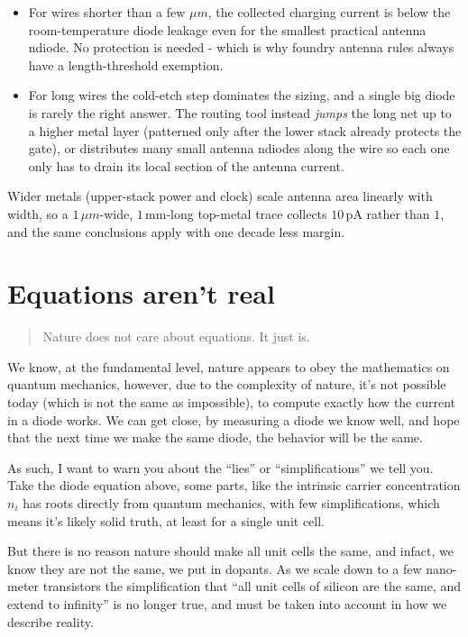 \begin{itemize}
\tightlist
\item
  For wires shorter than a few \(\mu m\), the collected charging current
  is below the room-temperature diode leakage even for the smallest
  practical antenna ndiode. No protection is needed - which is why
  foundry antenna rules always have a length-threshold exemption.
\item
  For long wires the cold-etch step dominates the sizing, and a single
  big diode is rarely the right answer. The routing tool instead
  \emph{jumps} the long net up to a higher metal layer (patterned only
  after the lower stack already protects the gate), or distributes many
  small antenna ndiodes along the wire so each one only has to drain its
  local section of the antenna current.
\end{itemize}

Wider metals (upper-stack power and clock) scale antenna area linearly
with width, so a \(1\, \mu m\)-wide, \(1\, \mathrm{mm}\)-long top-metal
trace collects \(10\, \mathrm{pA}\) rather than \(1\), and the same
conclusions apply with one decade less margin.

\section{Equations aren't real}\label{equations-arent-real}

\begin{quote}
Nature does not care about equations. It just is.
\end{quote}

We know, at the fundamental level, nature appears to obey the
mathematics on quantum mechanics, however, due to the complexity of
nature, it's not possible today (which is not the same as impossible),
to compute exactly how the current in a diode works. We can get close,
by measuring a diode we know well, and hope that the next time we make
the same diode, the behavior will be the same.

As such, I want to warn you about the ``lies'' or ``simplifications'' we
tell you. Take the diode equation above, some parts, like the intrinsic
carrier concentration \(n_i\) has roots directly from quantum mechanics,
with few simplifications, which means it's likely solid truth, at least
for a single unit cell.

But there is no reason nature should make all unit cells the same, and
infact, we know they are not the same, we put in dopants. As we scale
down to a few nano-meter transistors the simplification that ``all unit
cells of silicon are the same, and extend to infinity'' is no longer
true, and must be taken into account in how we describe reality.

